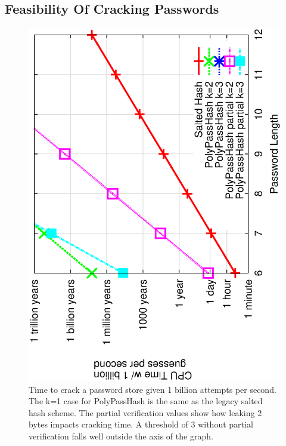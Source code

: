 %


\subsection{Feasibility Of Cracking Passwords}
\label{sec-feasibility}

\begin{figure}[t]
\hspace{-4mm}
\includegraphics[width=.36\textwidth, angle=270]{resultdata/plotcrack.eps}
	\caption{Time to crack a password store given 1 billion attempts
per second.   The k=1 case for PolyPassHash is the same as the
legacy salted hash scheme.   The partial verification values show 
how leaking 2 bytes impacts cracking time.   A threshold of 3 without partial 
verification falls well outside the axis of the graph.}
	\label{fig:cracktime}  
\end{figure}


